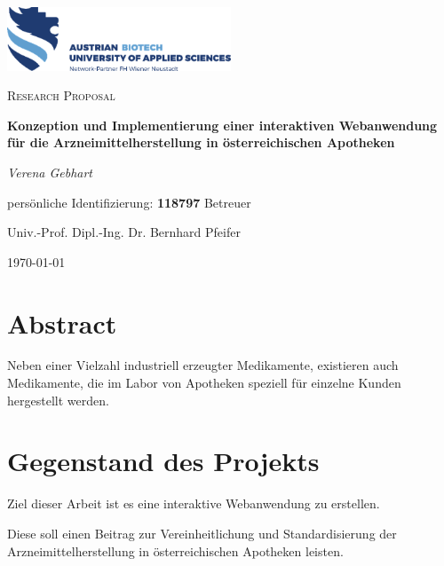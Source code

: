 \documentclass[12pt,a4paper]{article}
\begin{document}
\begin{titlepage}
	\centering
	\includegraphics[width=0.5\textwidth]{logo}\par\vspace{1cm}
	\vspace{1cm}
	{\scshape\Large Research Proposal\par}
	\vspace{1.5cm}
	{\LARGE\bfseries Konzeption und Implementierung einer interaktiven 
	Webanwendung für die Arzneimittelherstellung in österreichischen Apotheken \par}
	\vspace{2cm}
	{\large\itshape Verena Gebhart\par}
	\vspace{0.5cm}
	persönliche Identifizierung: \textbf{118797}
	\vfill
	Betreuer\par
	Univ.-Prof. Dipl.-Ing. Dr. Bernhard Pfeifer

	\vfill

	{\large \today\par}
\end{titlepage}


\tableofcontents
\newpage
\section{Abstract}

Neben einer Vielzahl industriell erzeugter Medikamente, existieren auch Medikamente, die im Labor von Apotheken speziell für einzelne Kunden hergestellt werden. 


\section{Gegenstand des Projekts}

Ziel dieser Arbeit ist es eine interaktive Webanwendung zu erstellen. 

Diese soll einen Beitrag zur Vereinheitlichung und Standardisierung der Arzneimittelherstellung in österreichischen Apotheken leisten. 
\end{document}

